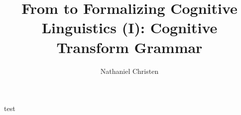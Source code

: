 \documentclass[10pt,twocolumn]{article}
\begin{document}
\title{From  to 
Formalizing Cognitive Linguistics (I): Cognitive Transform Grammar}
\author{Nathaniel Christen}

\newsavebox{\qboxi}
\newsavebox{\qboxii}

\begin{lrbox}{\qboxi}test%
\end{lrbox}
\end{document}

